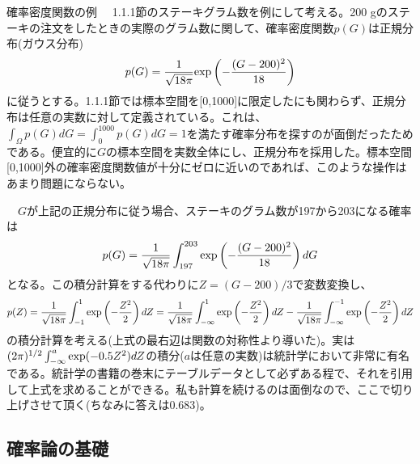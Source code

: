 \documentclass[dvipdfmx, 9pt, a4paper]{jsarticle}
\begin{document}
\begin{itembox}[l]{確率密度関数の例}
　1.1.1節のステーキグラム数を例にして考える。200 gのステーキの注文をしたときの実際のグラム数に関して、確率密度関数$p(G)$は正規分布(ガウス分布)
\begin{equation}
p(G)=\frac{1}{\sqrt{18\pi}}{\rm exp}\left(-\frac{(G-200)^2}{18} \right) \notag
\end{equation}
に従うとする。1.1.1節では標本空間を[0,1000]に限定したにも関わらず、正規分布は任意の実数に対して定義されている。これは、$\int_\Omega p(G) dG=\int_0^{1000} p(G) dG=1$を満たす確率分布を探すのが面倒だったためである。便宜的に$G$の標本空間を実数全体にし、正規分布を採用した。標本空間[0,1000]外の確率密度関数値が十分にゼロに近いのであれば、このような操作はあまり問題にならない。\par
　$G$が上記の正規分布に従う場合、ステーキのグラム数が197から203になる確率は
\begin{equation}
p(G)=\frac{1}{\sqrt{18\pi}} \int_{197}^{203} {\rm exp}\left(-\frac{(G-200)^2}{18} \right) dG \notag
\end{equation}
となる。この積分計算をする代わりに$Z=(G-200)/3$で変数変換し、
\begin{equation}
p(Z)=\frac{1}{\sqrt{18\pi}} \int_{-1}^{1}{\rm exp}\left(-\frac{Z^2}{2} \right) dZ
=\frac{1}{\sqrt{18\pi}} \int_{-\infty}^{1}{\rm exp}\left(-\frac{Z^2}{2} \right) dZ
-\frac{1}{\sqrt{18\pi}} \int_{-\infty}^{-1}{\rm exp}\left(-\frac{Z^2}{2} \right) dZ \notag
\end{equation}
の積分計算を考える(上式の最右辺は関数の対称性より導いた)。実は$(2\pi)^{1/2}\int_{-\infty}^{a}{\rm exp}(-0.5Z^2) dZ$の積分($a$は任意の実数)は統計学において非常に有名である。統計学の書籍の巻末にテーブルデータとして必ずある程で、それを引用して上式を求めることができる。私も計算を続けるのは面倒なので、ここで切り上げさせて頂く(ちなみに答えは0.683)。
\end{itembox}

\subsection{確率論の基礎}
\end{document}
